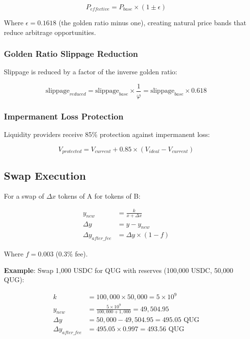 \documentclass[11pt,a4paper]{article}
\begin{document}
\begin{equation}
P_{effective} = P_{base} \times (1 \pm \epsilon)
\end{equation}

Where $\epsilon = 0.1618$ (the golden ratio minus one), creating natural price bands that reduce arbitrage opportunities.

\subsubsection{Golden Ratio Slippage Reduction}

Slippage is reduced by a factor of the inverse golden ratio:

\begin{equation}
\text{slippage}_{reduced} = \text{slippage}_{base} \times \frac{1}{\varphi} = \text{slippage}_{base} \times 0.618
\end{equation}

\subsubsection{Impermanent Loss Protection}

Liquidity providers receive 85\% protection against impermanent loss:

\begin{equation}
V_{protected} = V_{current} + 0.85 \times (V_{ideal} - V_{current})
\end{equation}

\subsection{Swap Execution}

For a swap of $\Delta x$ tokens of A for tokens of B:

\begin{align}
y_{new} &= \frac{k}{x + \Delta x} \\
\Delta y &= y - y_{new} \\
\Delta y_{after\_fee} &= \Delta y \times (1 - f)
\end{align}

Where $f = 0.003$ (0.3\% fee).

\textbf{Example}: Swap 1,000 USDC for QUG with reserves (100,000 USDC, 50,000 QUG):

\begin{align*}
k &= 100,000 \times 50,000 = 5 \times 10^9 \\
y_{new} &= \frac{5 \times 10^9}{100,000 + 1,000} = 49,504.95 \\
\Delta y &= 50,000 - 49,504.95 = 495.05 \text{ QUG} \\
\Delta y_{after\_fee} &= 495.05 \times 0.997 = 493.56 \text{ QUG}
\end{align*}
\end{document}
